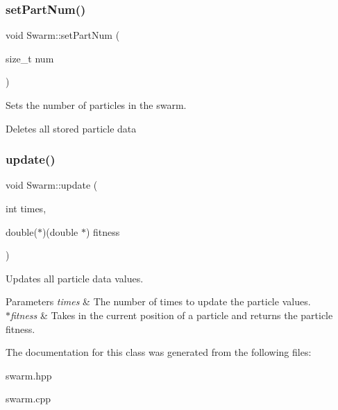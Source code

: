 \subsubsection{\texorpdfstring{set\+Part\+Num()}{setPartNum()}}
{\footnotesize\ttfamily void Swarm\+::set\+Part\+Num (\begin{DoxyParamCaption}\item[{size\+\_\+t}]{num }\end{DoxyParamCaption})}



Sets the number of particles in the swarm. 

Deletes all stored particle data \mbox{\label{classSwarm_ae2156e78f44bfd081fa6cf870dfdba81}} 
\subsubsection{\texorpdfstring{update()}{update()}}
{\footnotesize\ttfamily void Swarm\+::update (\begin{DoxyParamCaption}\item[{int}]{times,  }\item[{double($\ast$)(double $\ast$)}]{fitness }\end{DoxyParamCaption})}



Updates all particle data values. 


\begin{DoxyParams}{Parameters}
{\em times} & The number of times to update the particle values. \\
\hline
{\em $\ast$fitness} & Takes in the current position of a particle and returns the particle fitness. \\
\hline
\end{DoxyParams}


The documentation for this class was generated from the following files\+:\begin{DoxyCompactItemize}
\item 
swarm.\+hpp\item 
swarm.\+cpp\end{DoxyCompactItemize}
